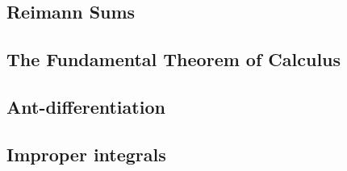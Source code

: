 \subsection{Reimann Sums}


\subsection{The Fundamental Theorem of Calculus}


\subsection{Ant-differentiation}


\subsection{Improper integrals}














